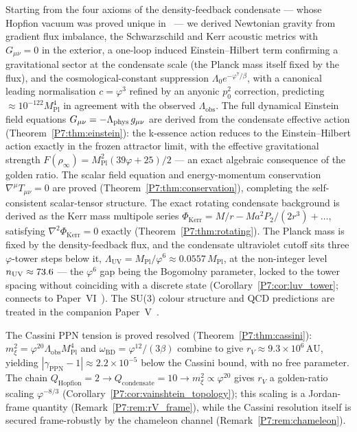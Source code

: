 \documentclass[11pt,a4paper]{article}
\theoremstyle{definition}
\theoremstyle{remark}
\newcommand{\vp}{\varphi}
\newcommand{\MPl}{M_{\mathrm{Pl}}}
\newcommand{\LUV}{\Lambda_{\mathrm{UV}}}
\newcommand{\Lobs}{\Lambda_{\mathrm{obs}}}
\newcommand{\rinfty}{\rho_{\infty}}
\newcommand{\oBD}{\omega_{\mathrm{BD}}}
\begin{document}
Starting from the four axioms of the density-feedback condensate ---
whose Hopfion vacuum was proved unique in~\cite{Paper1} ---
we derived Newtonian gravity from gradient flux imbalance, the
Schwarzschild and Kerr acoustic metrics with $G_{\mu\nu}=0$ in the
exterior, a one-loop induced Einstein--Hilbert term confirming a
gravitational sector at the condensate scale (the Planck mass itself
fixed by the flux), and the
cosmological-constant suppression $\Lambda_0 e^{-\vp^7/\beta}$, with a canonical leading normalisation $c=\vp^3$ refined by an anyonic $p_0^2$ correction, predicting $\approx10^{-122}\MPl^4$ in agreement with the observed $\Lobs$.
The full dynamical Einstein field equations $G_{\mu\nu}=-\Lambda_{\rm phys}\,g_{\mu\nu}$
are derived from the condensate effective action (Theorem~\ref{P7:thm:einstein}):
the k-essence action reduces to the Einstein--Hilbert action exactly in the frozen
attractor limit, with the effective gravitational strength
$F(\rinfty)=\MPl^2(39\vp+25)/2$ --- an exact algebraic consequence of the golden ratio.
The scalar field equation and energy-momentum conservation $\nabla^\mu T_{\mu\nu}=0$
are proved (Theorem~\ref{P7:thm:conservation}), completing the self-consistent
scalar-tensor structure.
The exact rotating condensate background is derived as the Kerr mass multipole
series $\Phi_{\mathrm{Kerr}}=M/r - Ma^2P_2/(2r^3)+\ldots$, satisfying
$\nabla^2\Phi_{\mathrm{Kerr}}=0$ exactly (Theorem~\ref{P7:thm:rotating}).
The Planck mass is fixed by the density-feedback flux, and the condensate
ultraviolet cutoff sits three $\vp$-tower steps below it,
$\LUV=\MPl/\vp^6\approx0.0557\,\MPl$, at the non-integer level $n_{\rm UV}\approx73.6$
--- the $\vp^6$ gap being the Bogomolny parameter, locked to the tower spacing
without coinciding with a discrete state (Corollary~\ref{P7:cor:luv_tower};
connects to Paper~VI~\cite{Paper6}).
The SU(3) colour structure and QCD predictions are treated in
the companion Paper~V~\cite{Paper5}.

The Cassini PPN tension is proved resolved (Theorem~\ref{P7:thm:cassini}):
$m_\xi^2=\vp^{20}\Lambda_{\mathrm{obs}}\MPl^4$ and $\oBD=\vp^{12}/(3\beta)$
combine to give $r_V\approx9.3\times10^6\,\mathrm{AU}$, yielding
$|\gamma_{\mathrm{PPN}}-1|\approx2.2\times10^{-5}$ below the Cassini bound,
with no free parameter.
The chain
$Q_{\mathrm{Hopfion}}=2 \to Q_{\mathrm{condensate}}=10 \to m_\xi^2\propto\vp^{20}$
gives $r_V$ a golden-ratio scaling $\vp^{-8/3}$
(Corollary~\ref{P7:cor:vainshtein_topology}); this scaling is a Jordan-frame
quantity (Remark~\ref{P7:rem:rV_frame}), while the Cassini resolution itself is
secured frame-robustly by the chameleon channel
(Remark~\ref{P7:rem:chameleon}).
\end{document}
